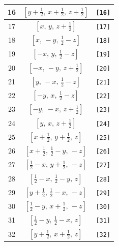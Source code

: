 \documentclass[fleqn,8pt]{jsarticle}
\begin{document}
\begin{longtable}{ccc}
16 & $\left[ y + \frac{1}{2},\, x + \frac{1}{2},\, z + \frac{1}{2} \right]$ & {\tt [16]} \\ \hline
17 & $\left[ x,\, y,\, z + \frac{1}{2} \right]$ & {\tt [17]} \\ \hline
18 & $\left[ x,\, - y,\, \frac{1}{2} - z \right]$ & {\tt [18]} \\ \hline
19 & $\left[ - x,\, y,\, \frac{1}{2} - z \right]$ & {\tt [19]} \\ \hline
20 & $\left[ - x,\, - y,\, z + \frac{1}{2} \right]$ & {\tt [20]} \\ \hline
21 & $\left[ y,\, - x,\, \frac{1}{2} - z \right]$ & {\tt [21]} \\ \hline
22 & $\left[ - y,\, x,\, \frac{1}{2} - z \right]$ & {\tt [22]} \\ \hline
23 & $\left[ - y,\, - x,\, z + \frac{1}{2} \right]$ & {\tt [23]} \\ \hline
24 & $\left[ y,\, x,\, z + \frac{1}{2} \right]$ & {\tt [24]} \\ \hline
25 & $\left[ x + \frac{1}{2},\, y + \frac{1}{2},\, z \right]$ & {\tt [25]} \\ \hline
26 & $\left[ x + \frac{1}{2},\, \frac{1}{2} - y,\, - z \right]$ & {\tt [26]} \\ \hline
27 & $\left[ \frac{1}{2} - x,\, y + \frac{1}{2},\, - z \right]$ & {\tt [27]} \\ \hline
28 & $\left[ \frac{1}{2} - x,\, \frac{1}{2} - y,\, z \right]$ & {\tt [28]} \\ \hline
29 & $\left[ y + \frac{1}{2},\, \frac{1}{2} - x,\, - z \right]$ & {\tt [29]} \\ \hline
30 & $\left[ \frac{1}{2} - y,\, x + \frac{1}{2},\, - z \right]$ & {\tt [30]} \\ \hline
31 & $\left[ \frac{1}{2} - y,\, \frac{1}{2} - x,\, z \right]$ & {\tt [31]} \\ \hline
32 & $\left[ y + \frac{1}{2},\, x + \frac{1}{2},\, z \right]$ & {\tt [32]} \\
\end{longtable}
\end{document}
